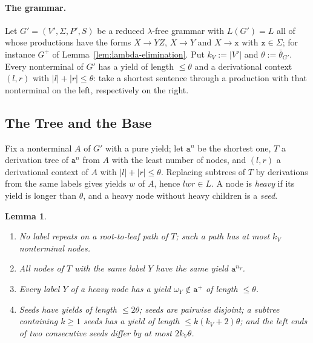 \documentclass[11pt]{article}
\numberwithin{equation}{section}
\theoremstyle{plain}
\newtheorem{lemma}[theorem]{Lemma}
\theoremstyle{definition}
\theoremstyle{remark}
\theoremstyle{plain}
\begin{document}
\paragraph{The grammar.}
Let $G'=(V',\Sigma,P',S)$ be a reduced $\lambda$-free grammar with $L(G')=L$ all of whose
productions have the forms $X\to YZ$, $X\to Y$ and $X\to\mathtt x$ with
$\mathtt x\in\Sigma$; for instance $G^+$ of Lemma~\ref{lem:lambda-elimination}.
Put $k_V:=|V'|$ and $\theta:=\bar\theta_{G'}$.  Every nonterminal of $G'$ has
a yield of length $\le\theta$ and a derivational context $(l,r)$ with
$|l|+|r|\le\theta$: take a shortest sentence through a production with that
nonterminal on the left, respectively on the right.

\subsection{The Tree and the Base}

Fix a nonterminal $A$ of $G'$ with a pure yield; let $\mathtt a^n$ be the
shortest one, $T$ a derivation tree of $\mathtt a^n$ from $A$ with the least
number of nodes, and $(l,r)$ a derivational context of $A$ with
$|l|+|r|\le\theta$.  Replacing subtrees of $T$ by derivations from the same
labels gives yields $w$ of $A$, hence $lwr\in L$.  A node is \emph{heavy} if
its yield is longer than $\theta$, and a heavy node without heavy children is a
\emph{seed}.

\begin{lemma}
\label{lem:app-h-tree}
\begin{enumerate}[label=\textup{(\alph*)},leftmargin=*]
\item No label repeats on a root-to-leaf path of $T$; such a path has at
most $k_V$ nonterminal nodes.
\item All nodes of $T$ with the same label $Y$ have the same yield
$\mathtt a^{n_Y}$.
\item Every label $Y$ of a heavy node has a yield $\omega_Y\notin\mathtt a^+$ of
length $\le\theta$.
\item Seeds have yields of length $\le2\theta$; seeds are pairwise disjoint;
a subtree containing $k\ge1$ seeds has a yield of length $\le k(k_V+2)\theta$; and
the left ends of two consecutive seeds differ by at most $2k_V\theta$.
\end{enumerate}
\end{lemma}
\end{document}

